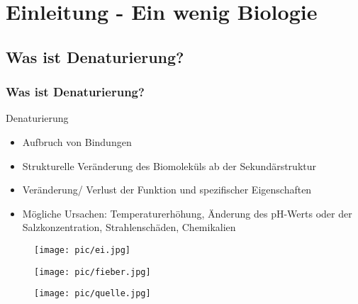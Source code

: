 

\section{Einleitung - Ein wenig Biologie}
\subsection{Was ist Denaturierung?}
\begin{frame}
  \frametitle{Was ist Denaturierung?}
	\begin{block}{Denaturierung}
	\begin{itemize}
	\item Aufbruch von Bindungen
	\item Strukturelle Veränderung des Biomoleküls ab der Sekundärstruktur
	\item Veränderung/ Verlust der Funktion und spezifischer Eigenschaften
	\item Mögliche Ursachen: Temperaturerhöhung, Änderung des pH-Werts oder der Salzkonzentration, Strahlenschäden, Chemikalien
	\end{itemize}
	\end{block}
		\begin{minipage}{3.5cm}
		\centering
\begin{figure}[h]
	\centering
		\texttt{[image: pic/ei.jpg]}
\end{figure}
	\cite{EI14}
\end{minipage}
\begin{minipage}{3.5cm}
		\centering
\begin{figure}[h]
	\centering
		\texttt{[image: pic/fieber.jpg]}
\end{figure}
	\cite{TH14}
\end{minipage}
\begin{minipage}{3.5cm}
		\centering
\begin{figure}[h]
	\centering
		\texttt{[image: pic/quelle.jpg]}
\end{figure}
	\cite{QU14}
\end{minipage}

\end{frame}


